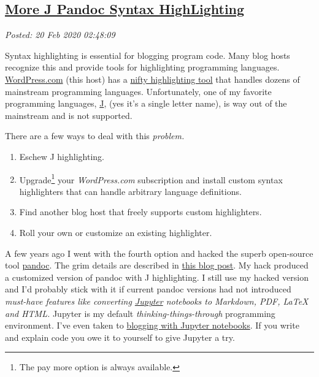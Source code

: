 %

\subsection*{\href{https://analyzethedatanotthedrivel.org/2020/02/19/more-j-pandoc-syntax-highlighting/}{More J Pandoc Syntax HighLighting}}


\noindent\emph{Posted: 20 Feb 2020 02:48:09}
\vspace{6pt}

Syntax highlighting is essential for blogging program code. Many blog
hosts recognize this and provide tools for highlighting programming
languages. \href{https://wordpress.com/}{WordPress.com} (this host) has
a
\href{https://en.support.wordpress.com/wordpress-editor/blocks/syntax-highlighter-code-block/}{nifty
highlighting tool} that handles dozens of mainstream programming
languages. Unfortunately, one of my favorite programming languages,
\href{//www.jsoftware.com}{J}, (yes it's a single letter name), is way
out of the mainstream and is not supported.

There are a few ways to deal with this \emph{problem.}

\begin{enumerate}
\def\labelenumi{\arabic{enumi}.}
\item
  Eschew J highlighting.
\item
  Upgrade\footnote{
  The pay more option is always available.
  } your
  \emph{WordPress.com} subscription and install custom syntax
  highlighters that can handle arbitrary language definitions.
\item
  Find another blog host that freely supports custom highlighters.
\item
  Roll your own or customize an existing highlighter.
\end{enumerate}

A few years ago I went with the fourth option and hacked the superb
open-source tool \href{https://pandoc.org/}{pandoc}. The grim details
are described in
\href{https://analyzethedatanotthedrivel.org/2012/09/20/pandoc-based-j-syntax-highlighting/}{this
blog post}. My hack produced a customized version of pandoc with J
highlighting. I still use my hacked version and I'd probably stick with
it if current pandoc versions had not introduced \emph{must-have
features like converting \href{https://jupyter.org/}{Jupyter} notebooks
to Markdown, PDF, LaTeX and HTML.} Jupyter is my default
\emph{thinking-things-through} programming environment. I've even taken
to
\href{https://github.com/bakerjd99/smugpyter/blob/master/notebooks/Unified\%20XKCD\%20Colors.ipynb}{blogging
with Jupyter notebooks}. If you write and explain code you owe it to
yourself to give Jupyter a try.

